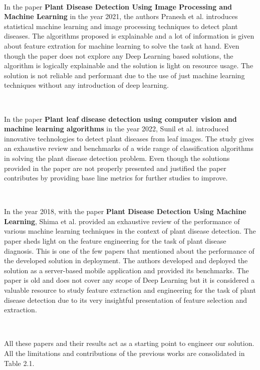 \

In the paper \textbf{Plant Disease Detection Using Image Processing and Machine Learning} in the year 2021, the authors Pranesh et al. introduces statistical machine learning and image processing techniques to detect plant diseases. The algorithms proposed is explainable and a lot of information is given about feature extration for machine learning to solve the task at hand. Even though the paper does not explore any Deep Learning based solutions, the algorithm is logically explainable and the solution is light on resource usage. The solution is not reliable and performant due to the use of just machine learning techniques without any introduction of deep learning. 

\

In the paper \textbf{Plant leaf disease detection using computer vision and machine learning
algorithms} in the year 2022, Sunil et al. introduced innovative technologies to detect plant diseases from leaf images. The study gives an exhaustive review and benchmarks of a wide range of classification algorithms in solving the plant disease detection problem. Even though the solutions provided in the paper are not properly presented and justified the paper contributes by providing base line metrics for further studies to improve.

\

In the year 2018, with the paper \textbf{Plant Disease Detection Using Machine Learning}, Shima et al. provided an exhaustive review of the performance of various machine learning techniques in the context of plant disease detection. The paper sheds light on the feature engineering for the task of plant disease diagnosis. This is one of the few papers that mentioned about the performance of the developed solution in deployment. The authors developed and deployed the solution as a server-based mobile application and provided its benchmarks. The paper is old and does not cover any scope of Deep Learning but it is considered a valuable resource to study feature extraction and engineering for the task of plant disease detection due to its very insightful presentation of feature selection and extraction.

\

All these papers and their results act as a starting point to engineer our solution. All the limitations and contributions of the previous works are consolidated in Table 2.1.

